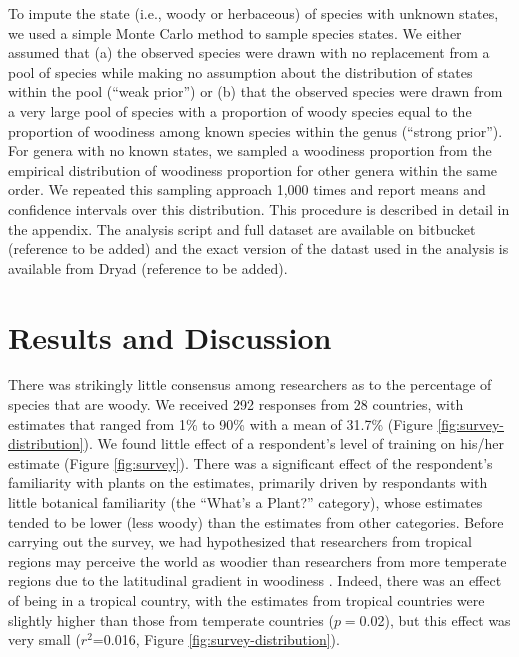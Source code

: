 \documentclass[12pt]{article}
\begin{document}
To impute the state (i.e., woody or herbaceous) of species with
unknown states, we used a simple Monte Carlo method to sample species
states.  We either assumed that (a) the observed species were drawn
with no replacement from a pool of species while making no assumption
about the distribution of states within the pool (``weak prior'') or
(b) that the observed species were drawn from a very large pool of
species with a proportion of woody species equal to the proportion of
woodiness among known species within the genus (``strong prior'').
%
For genera with no known states, we sampled a woodiness proportion
from the empirical distribution of woodiness proportion for other
genera within the same order.
%
We repeated this sampling approach 1,000 times and report means and
confidence intervals over this distribution.
%
This procedure is described in detail in the appendix.  The analysis
script and full dataset are available on bitbucket (reference to be
added) and the exact version of the datast used in the analysis is
available from Dryad (reference to be added).


\section{Results and Discussion}

There was strikingly little consensus among researchers as to the
percentage of species that are woody.  We received 292 responses from
28 countries, with estimates that ranged from 1\% to 90\% with a mean
of 31.7\% (Figure \ref{fig:survey-distribution}).
We found little effect of a respondent's level of training on his/her
estimate (Figure \ref{fig:survey}).  There was a significant effect of
the respondent's familiarity with plants on the estimates, primarily
driven by respondants with little botanical familiarity (the ``What's
a Plant?'' category), whose estimates tended to be lower (less
woody) than the estimates from other categories.
%
Before carrying out the survey, we had hypothesized that researchers
from tropical regions may perceive the world as woodier than
researchers from more temperate regions due to the latitudinal
gradient in woodiness \citep{Molesheihgt}.
%
Indeed, there was an effect of being in a tropical country, with the
estimates from tropical countries were slightly higher than those from
temperate countries ($p=$0.02), but this effect was very small
($r^2$=0.016, Figure \ref{fig:survey-distribution}).
\end{document}
